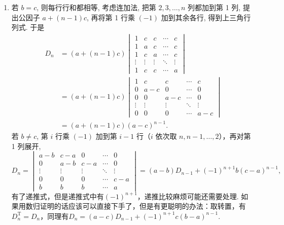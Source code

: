 \begin{enumerate}
    \item 若 $b=c$, 则每行行和都相等, 考虑连加法, 把第 $2,3, \ldots, n$ 列都加到第 1 列, 提出公因子 $a+(n-1) c$, 再将第 1 行乘 $(-1)$ 加到其余各行, 得到上三角行列式. 于是
          \begin{align*}
              D_{n} & =(a+(n-1) c)\begin{vmatrix}
                                      1      & c      & c      & \cdots & c      \\
                                      1      & a      & c      & \cdots & c      \\
                                      1      & c      & a      & \cdots & c      \\
                                      \vdots & \vdots & \vdots & \ddots & \vdots \\
                                      1      & c      & c      & \cdots & a
                                  \end{vmatrix} \\
                    & =(a+(n-1) c)\begin{vmatrix}
                                      1      & c      & c      & \cdots & c      \\
                                      0      & a-c    & 0      & \cdots & 0      \\
                                      0      & 0      & a-c    & \cdots & 0      \\
                                      \vdots & \vdots & \vdots & \ddots & \vdots \\
                                      0      & 0      & 0      & \cdots & a-c
                                  \end{vmatrix} \\
                    & =(a+(n-1) c)(a-c)^{n-1} .
          \end{align*}
          若 $b \neq c$, 第 $i$ 行乘 $(-1)$ 加到第 $i-1$ 行（$i$ 依次取 $n, n-1, \ldots, 2$），再对第 1 列展开,
          \[D_{n}=\begin{vmatrix}
                  a-b    & c-a    & 0      & \cdots & 0      \\
                  0      & a-b    & c-a    & \cdots & 0      \\
                  \vdots & \vdots & \vdots & \ddots & \vdots \\
                  0      & 0      & 0      & \cdots & c-a    \\
                  b      & b      & b      & \cdots & a
              \end{vmatrix}=(a-b)D_{n-1}+(-1)^{n+1}b(c-a)^{n-1},\]
          有了递推式，但是递推式中有$(-1)^{n+1}$，递推比较麻烦可能还需要处理. 如果用数归证明的话应该可以直接下手了，但是有更聪明的办法：取转置，有$D_n^\mathrm{T}=D_n$，同理有$D_n=(a-c)D_{n-1}+(-1)^{n+1}c(b-a)^{n-1}$.
\end{enumerate}

